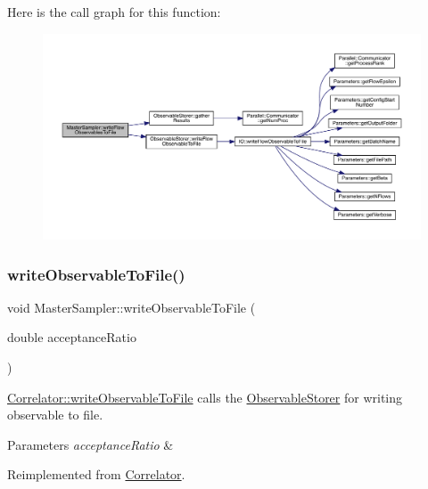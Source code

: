 Here is the call graph for this function\+:\nopagebreak
\begin{figure}[H]
\begin{center}
\leavevmode
\includegraphics[width=350pt]{class_master_sampler_ad475928217ac61fae134128904aaa9f8_cgraph}
\end{center}
\end{figure}
\mbox{\label{class_master_sampler_a638714c38e1a6252ab8b6be1fa224bd4}} 
\subsubsection{\texorpdfstring{writeObservableToFile()}{writeObservableToFile()}}
{\footnotesize\ttfamily void Master\+Sampler\+::write\+Observable\+To\+File (\begin{DoxyParamCaption}\item[{double}]{acceptance\+Ratio }\end{DoxyParamCaption})\hspace{0.3cm}{\ttfamily [virtual]}}



\mbox{\hyperlink{class_correlator_a9e8d80e30e4fbe3b7fe57521538cb5ff}{Correlator\+::write\+Observable\+To\+File}} calls the \mbox{\hyperlink{class_observable_storer}{Observable\+Storer}} for writing observable to file. 


\begin{DoxyParams}{Parameters}
{\em acceptance\+Ratio} & \\
\hline
\end{DoxyParams}


Reimplemented from \mbox{\hyperlink{class_correlator_a9e8d80e30e4fbe3b7fe57521538cb5ff}{Correlator}}.

